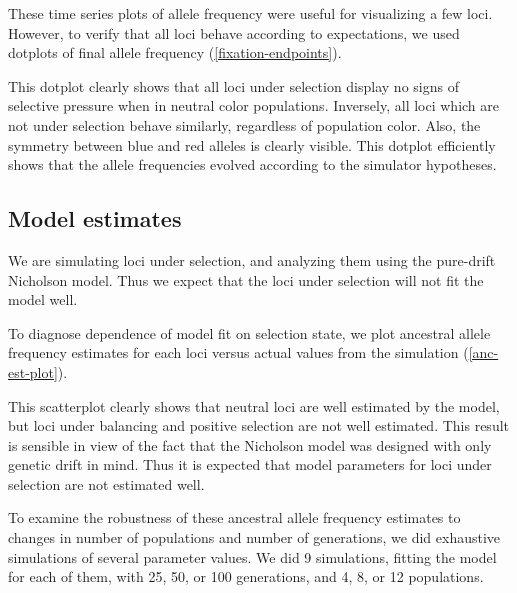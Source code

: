 \documentclass[a4paper,12pt]{article}
\begin{document}
These time series plots of allele frequency were useful for
visualizing a few loci. However, to verify that all loci behave
according to expectations, we used dotplots of final allele frequency
(\autoref{fixation-endpoints}).


This dotplot clearly shows that all loci under selection display no
signs of selective pressure when in neutral color
populations. Inversely, all loci which are not under selection behave
similarly, regardless of population color. Also, the symmetry between
blue and red alleles is clearly visible. This dotplot efficiently
shows that the allele frequencies evolved according to the simulator
hypotheses.

\subsection{Model estimates}

We are simulating loci under selection, and analyzing them using the
pure-drift Nicholson model. Thus we expect that the loci under
selection will not fit the model well.

To diagnose dependence of model fit on selection state, we plot
ancestral allele frequency estimates for each loci versus actual
values from the simulation (\autoref{anc-est-plot}).


This scatterplot clearly shows that neutral loci are well estimated by
the model, but loci under balancing and positive selection are not
well estimated. This result is sensible in view of the fact that the
Nicholson model was designed with only genetic drift in mind. Thus it
is expected that model parameters for loci under selection are not
estimated well.

To examine the robustness of these ancestral allele frequency
estimates to changes in number of populations and number of
generations, we did exhaustive simulations of several parameter
values. We did 9 simulations, fitting the model for each of them, with
25, 50, or 100 generations, and 4, 8, or 12 populations.
\end{document}

